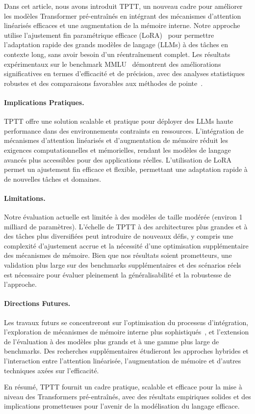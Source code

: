 \documentclass[10pt,a4paper]{article}
\begin{document}
Dans cet article, nous avons introduit TPTT, un nouveau cadre pour améliorer les modèles Transformer pré-entraînés en intégrant des mécanismes d'attention linéarisés efficaces et une augmentation de la mémoire interne. Notre approche utilise l'ajustement fin paramétrique efficace (LoRA)~\cite{hu2022lora} pour permettre l'adaptation rapide des grands modèles de langage (LLMs) à des tâches en contexte long, sans avoir besoin d'un réentraînement complet. Les résultats expérimentaux sur le benchmark MMLU~\cite{hendrycks2020measuring} démontrent des améliorations significatives en termes d'efficacité et de précision, avec des analyses statistiques robustes et des comparaisons favorables aux méthodes de pointe~\cite{gu2023mamba, zhang2024lolcats, lan2025liger}.

\paragraph{Implications Pratiques.}
TPTT offre une solution scalable et pratique pour déployer des LLMs haute performance dans des environnements contraints en ressources. L'intégration de mécanismes d'attention linéarisés et d'augmentation de mémoire réduit les exigences computationnelles et mémorielles, rendant les modèles de langage avancés plus accessibles pour des applications réelles. L'utilisation de LoRA permet un ajustement fin efficace et flexible, permettant une adaptation rapide à de nouvelles tâches et domaines.

\paragraph{Limitations.}
Notre évaluation actuelle est limitée à des modèles de taille modérée (environ 1 milliard de paramètres). L'échelle de TPTT à des architectures plus grandes et à des tâches plus diversifiées peut introduire de nouveaux défis, y compris une complexité d'ajustement accrue et la nécessité d'une optimisation supplémentaire des mécanismes de mémoire. Bien que nos résultats soient prometteurs, une validation plus large sur des benchmarks supplémentaires et des scénarios réels est nécessaire pour évaluer pleinement la généralisabilité et la robustesse de l'approche.

\paragraph{Directions Futures.}
Les travaux futurs se concentreront sur l'optimisation du processus d'intégration, l'exploration de mécanismes de mémoire interne plus sophistiqués~\cite{behrouz2024titans}, et l'extension de l'évaluation à des modèles plus grands et à une gamme plus large de benchmarks. Des recherches supplémentaires étudieront les approches hybrides et l'interaction entre l'attention linéarisée, l'augmentation de mémoire et d'autres techniques axées sur l'efficacité.

En résumé, TPTT fournit un cadre pratique, scalable et efficace pour la mise à niveau des Transformers pré-entraînés, avec des résultats empiriques solides et des implications prometteuses pour l'avenir de la modélisation du langage efficace.



\end{document}
